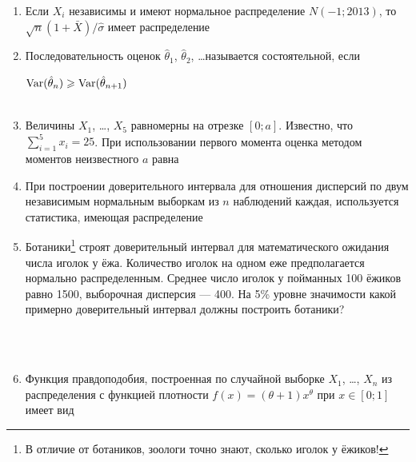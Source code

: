 \documentclass[12pt, a4paper]{article}\usepackage[]{graphicx}\usepackage[]{color}
\begin{document}
\begin{enumerate}

\item Если $X_i$ независимы и имеют нормальное распределение $N(-1;2013)$, то $\sqrt{n}(1+\bar{X})/\hat{\sigma}$ имеет распределение


\item Последовательность оценок $\hat{\theta}_1$, $\hat{\theta}_2$, \ldots называется состоятельной, если

{$\operatorname{Var}(\hat{\theta}_n)\geqslant \operatorname{Var}(\hat{\theta}_{n+1})$} \\ \\

\item Величины $X_1$, \ldots, $X_5$ равномерны на отрезке $[0;a]$. Известно, что $\sum_{i=1}^5 x_i=25$. При использовании первого момента оценка методом моментов неизвестного $a$ равна


\item При построении доверительного интервала для отношения дисперсий по двум независимым нормальным выборкам из $n$ наблюдений каждая, используется статистика, имеющая распределение


\item Ботаники\footnote{В отличие от ботаников, зоологи точно знают, сколько иголок у ёжиков!} строят доверительный интервал для математического ожидания числа иголок у ёжа. Количество иголок на одном еже предполагается нормально распределенным. Среднее число иголок у пойманных 100 ёжиков равно 1500, выборочная дисперсия — 400. На 5\% уровне значимости какой примерно доверительный интервал должны построить ботаники?


\\ \\

\item Функция правдоподобия, построенная по случайной выборке $X_1$, \ldots, $X_n$ из распределения с функцией плотности $f(x)=(\theta+1)x^{\theta}$ при $x\in [0;1]$ имеет вид


\end{enumerate}
\end{document}
